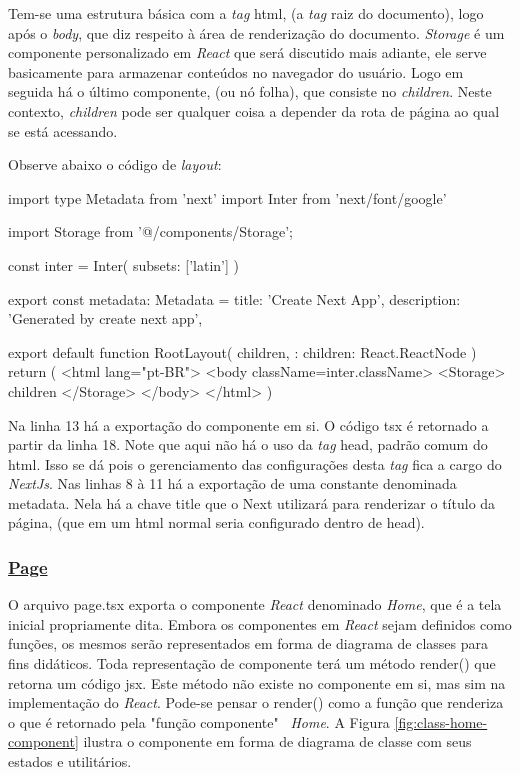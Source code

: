 Tem-se uma estrutura básica com a \textit{tag} html, (a \textit{tag} raiz do documento),
logo após o \textit{body}, que diz respeito à área de renderização do documento.
\textit{Storage} é um componente personalizado em \textit{React} que será discutido mais adiante,
ele serve basicamente para armazenar conteúdos no navegador do usuário.
Logo em seguida há o último componente, (ou nó folha), que consiste no
\textit{children}. Neste contexto, \textit{children} pode ser qualquer coisa a depender
da rota de página ao qual se está acessando.

Observe abaixo o código de \textit{layout}:

\begin{Codec497bcddd3784ae1a571a07cb2321fa0}
import type { Metadata } from 'next'
import { Inter } from 'next/font/google'

import Storage from '@/components/Storage';

const inter = Inter({ subsets: ['latin'] })

export const metadata: Metadata = {
    title: 'Create Next App',
    description: 'Generated by create next app',
}

export default function RootLayout({
    children,
}: {
    children: React.ReactNode
}) {
    return (
        <html lang="pt-BR">
            <body className={inter.className}>
                <Storage>
                    {children}
                </Storage>
            </body>
        </html>
    )
}
\end{Codec497bcddd3784ae1a571a07cb2321fa0}

Na linha 13 há a exportação do componente em si. O código
\acrshort{tsx}
é retornado a partir da linha 18.
Note que aqui não há o uso da \textit{tag} head, padrão comum do
\acrshort{html}. Isso se dá
pois o gerenciamento das configurações desta \textit{tag} fica
a cargo do \textit{NextJs}. Nas linhas 8 à 11
há a exportação de uma constante denominada metadata. Nela
há a chave title que o Next utilizará para renderizar o
título da página, (que em um html normal seria configurado
dentro de head).

\subsubsection{\underline{Page}}

O arquivo page.tsx exporta o componente \textit{React} denominado \textit{Home},
que é a tela inicial propriamente dita.
Embora os componentes em \textit{React} sejam definidos como funções,
os mesmos serão representados em forma de diagrama de
classes para fins didáticos. Toda representação de
componente terá um método render() que retorna um código
\acrshort{jsx}. Este método
não existe no componente em si, mas sim na implementação
do \textit{React}. Pode-se pensar o render() como a função que
renderiza o que é retornado pela "função componente"~
\textit{Home}.
A
Figura \ref{fig:class-home-component}
ilustra o componente em forma de diagrama de classe com seus estados e utilitários.

